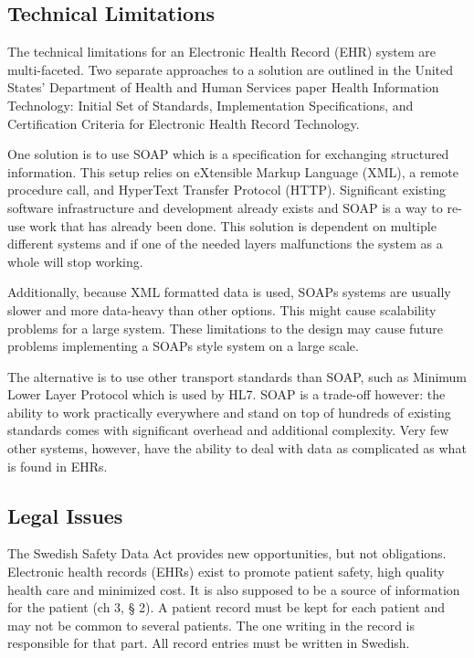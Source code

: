 \documentclass[14pt]{article}
\begin{document}
\subsection{Technical Limitations}
\label{sec:futureTechnical}
The technical limitations for an Electronic Health Record (\gls{EHR}) system are multi-faceted. Two separate approaches to a solution are outlined in the United States’ Department of Health and Human Services paper Health Information Technology: Initial Set of Standards, Implementation Specifications, and Certification Criteria for Electronic Health Record Technology. \cite{AMA} 

One solution is to use \gls{SOAP} which is a specification for exchanging structured information. This setup relies on eXtensible Markup Language (\gls{XML}), a remote procedure call, and HyperText Transfer Protocol (\gls{HTTP}). Significant existing software infrastructure and development already exists and SOAP is a way to re-use work that has already been done. This solution is dependent on multiple different systems and if one of the needed layers malfunctions the system as a whole will stop working. 

Additionally, because \gls{XML} formatted data is used, \glspl{SOAP} systems are usually slower and more data-heavy than other options. This might cause scalability problems for a large system. These limitations to the design may cause future problems implementing a \glspl{SOAP} style system on a large scale.

The alternative is to use other transport standards than \gls{SOAP}, such as Minimum Lower Layer Protocol which is used by \gls{HL7}. \gls{SOAP} is a trade-off however: the ability to work practically everywhere and stand on top of hundreds of existing standards comes with significant overhead and additional complexity. Very few other systems, however, have the ability to deal with data as complicated as what is found in \glspl{EHR}.

\subsection{Legal Issues}
\label{sec:futureLegal}
The Swedish Safety Data Act provides new opportunities, but not obligations. \cite{RiR19} Electronic health records (\glspl{EHR}) exist to promote patient safety, high quality health care and minimized cost. It is also supposed to be a source of information for the patient (ch 3, § 2). A patient record must be kept for each patient and may not be common to several patients. The one writing in the record is responsible for that part. All record entries must be written in Swedish. \cite{PatientDataAct}
\end{document}
